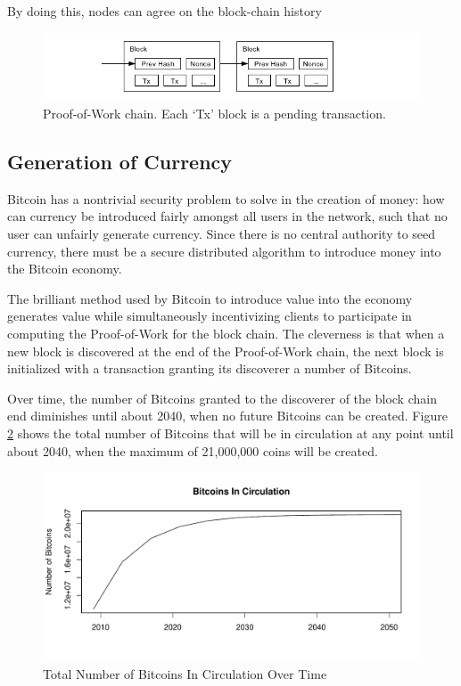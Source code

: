 \documentclass{report}
\begin{document}
    By doing this, nodes can agree on the block-chain history

    \begin{figure}[h]
      \begin{center}
        \includegraphics{images/blockchain.png}
        \caption{Proof-of-Work chain. Each `Tx' block is a pending transaction. \cite{Nakamoto:Bitcoin}}
        \label{fig:blockchain}
      \end{center}
    \end{figure}

\subsection*{Generation of Currency}
Bitcoin has a nontrivial security problem to solve in the creation of money: how
can currency be introduced fairly amongst all users in the network, such that no
user can unfairly generate currency. Since there is no central authority to seed
currency, there must be a secure distributed algorithm to introduce money into
the Bitcoin economy.

The brilliant method used by Bitcoin to introduce value into the economy
generates value while simultaneously incentivizing clients to participate in
computing the Proof-of-Work for the block chain. The cleverness is that when a
new block is discovered at the end of the Proof-of-Work chain, the next block is
initialized with a transaction granting its discoverer a number of Bitcoins.

Over time, the number of Bitcoins granted to the discoverer of the block chain
end diminishes until about 2040, when no future Bitcoins can be created. Figure
\ref{fig:totalcoins} shows the total number of Bitcoins that will be in
circulation at any point until about 2040, when the maximum of 21,000,000 coins
will be created.

\begin{figure}[h]
\begin{center}
\includegraphics[width=\textwidth]{images/quantity_v_time.pdf}
\caption{Total Number of Bitcoins In Circulation Over Time}
\label{fig:totalcoins}
\end{center}
\end{figure}
\end{document}

